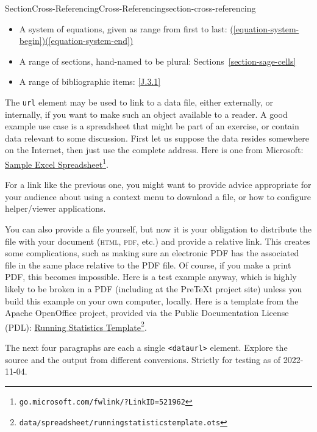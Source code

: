 \documentclass[twoside,10pt,]{article}
\newcommand{\xreffont}{\relax}
\newcommand{\mono}[1]{\texttt{#1}}
\newcommand{\initialism}[1]{\textsc{\MakeLowercase{#1}}}
\numberwithin{equation}{section}
\begin{document}
\begin{sectionptx}{Section}{Cross-Referencing}{}{Cross-Referencing}{}{}{section-cross-referencing}
\begin{itemize}[label=\textbullet]
\item{}A system of equations, given as range from first to last: \hyperref[equation-system-begin]{({\xreffont\ref{equation-system-begin}})\textendash{}({\xreffont\ref{equation-system-end}})}%
\item{}A range of sections, hand-named to be plural: Sections~\hyperref[section-sage-cells]{{\xreffont\ref{section-sage-cells}}\textendash{}{\xreffont\ref{section-cross-referencing}}}%
\item{}A range of bibliographic items: \hyperlink{biblio-judson-AATA}{[{\xreffont J.3.1}\textendash{}{\xreffont 2}]}%
\end{itemize}
%
\par
The \mono{url} element may be used to link to a data file, either externally, or internally, if you want to make such an object available to a reader.  A good example use case is a spreadsheet that might be part of an exercise, or contain data relevant to some discussion.  First let us suppose the data resides somewhere on the Internet, then just use the complete address.  Here is one from Microsoft: \href{http://go.microsoft.com/fwlink/?LinkID=521962}{Sample Excel Spreadsheet}\footnote{\nolinkurl{go.microsoft.com/fwlink/?LinkID=521962}\label{section-cross-referencing-16-5}}.%
\par
For a link like the previous one, you might want to provide advice appropriate for your audience about using a context menu to download a file, or how to configure helper\slash{}viewer applications.%
\par
You can also provide a file yourself, but now it is your obligation to distribute the file with your document (\initialism{HTML}, \initialism{PDF}, etc.\@) and provide a relative link.  This creates some complications, such as making sure an electronic PDF has the associated file in the same place relative to the PDF file.  Of course, if you make a print PDF, this becomes impossible.  Here is a test example anyway, which is highly likely to be broken in a PDF (including at the PreTeXt project site) unless you build this example on your own computer, locally.  Here is a template from the Apache OpenOffice project, provided via the Public Documentation License (PDL):  \href{data/spreadsheet/runningstatisticstemplate.ots}{Running Statistics Template}\footnote{\nolinkurl{data/spreadsheet/runningstatisticstemplate.ots}\label{section-cross-referencing-18-6}}.%
\par
The next four paragraphs are each a single \mono{<dataurl>} element.  Explore the source and the output from different conversions.  Strictly for testing as of 2022-11-04.%

\end{sectionptx}
\end{document}
